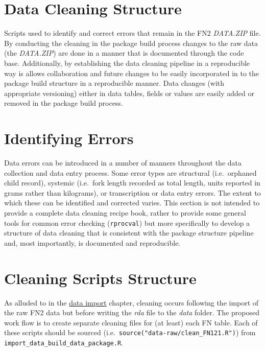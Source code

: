 \documentclass[
]{book}
\begin{document}
\hypertarget{data-cleaning-structure}{%
\section{Data Cleaning Structure}\label{data-cleaning-structure}}

Scripts used to identify and correct errors that remain in the FN2 \emph{DATA.ZIP} file. By conducting the cleaning in the package build process changes to the raw data (the \emph{DATA.ZIP}) are done in a manner that is documented through the code base. Additionally, by establishing the data cleaning pipeline in a reproducible way is allows collaboration and future changes to be easily incorporated in to the package build structure in a reproducible manner. Data changes (with appropriate versioning) either in data tables, fields or values are easily added or removed in the package build process.

\hypertarget{identifying-errors}{%
\section{Identifying Errors}\label{identifying-errors}}

Data errors can be introduced in a number of manners throughout the data collection and data entry process. Some error types are structural (i.e.~orphaned child record), systemic (i.e.~fork length recorded as total length, units reported in grams rather than kilograms), or transcription or data entry errors. The extent to which these can be identified and corrected varies. This section is not intended to provide a complete data cleaning recipe book, rather to provide some general tools for common error checking (\texttt{rprocval}) but more specifically to develop a structure of data cleaning that is consistent with the package structure pipeline and, most importantly, is documented and reproducible.

\hypertarget{cleaning-scripts-structure}{%
\section{Cleaning Scripts Structure}\label{cleaning-scripts-structure}}

As alluded to in the \href{data-import.html}{data import} chapter, cleaning occurs following the import of the raw FN2 data but before writing the \emph{rda} file to the \emph{data} folder. The proposed work flow is to create separate cleaning files for (at least) each FN table. Each of these scripts should be sourced (i.e.~\texttt{source("data-raw/clean\_FN121.R")}) from \texttt{import\_data\_build\_data\_package.R}.
\end{document}
